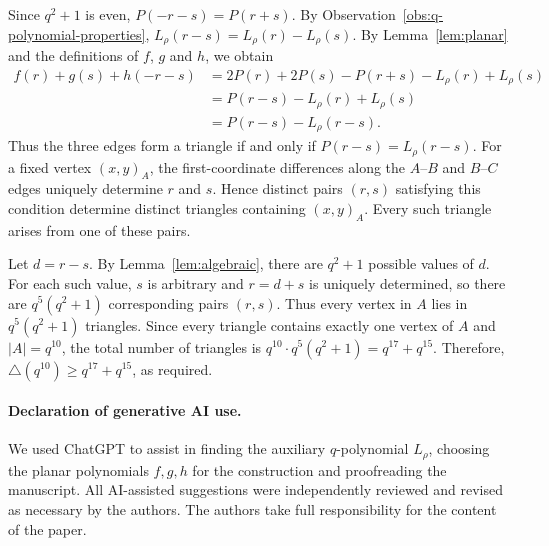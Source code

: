 \documentclass[12pt]{article}
\numberwithin{equation}{section}
\theoremstyle{definition}
\begin{document}
Since $q^2+1$ is even, $P(-r-s)=P(r+s)$. By Observation~\ref{obs:q-polynomial-properties}, $L_\rho(r-s)=L_\rho(r)-L_\rho(s)$. By Lemma~\ref{lem:planar} and the definitions of $f$, $g$ and $h$, we obtain
\[
\begin{aligned}
f(r)+g(s)+h(-r-s)
&=2P(r)+2P(s)-P(r+s)-L_\rho(r)+L_\rho(s)\\
&=P(r-s)-L_\rho(r)+L_\rho(s)\\
&=P(r-s)-L_\rho(r-s).
\end{aligned}
\]
Thus the three edges form a triangle if and only if $P(r-s)=L_\rho(r-s)$.
For a fixed vertex $(x,y)_A$, the first-coordinate differences along the $A$--$B$ and $B$--$C$ edges uniquely determine $r$ and $s$. Hence distinct pairs $(r,s)$ satisfying this condition determine distinct triangles containing $(x,y)_A$. Every such triangle arises from one of these pairs.

Let $d=r-s$. By Lemma~\ref{lem:algebraic}, there are $q^2+1$ possible values of $d$. For each such value, $s$ is arbitrary and $r=d+s$ is uniquely determined, so there are $q^5(q^2+1)$ corresponding pairs $(r,s)$. Thus every vertex in $A$ lies in $q^5(q^2+1)$ triangles. Since every triangle contains exactly one vertex of $A$ and $|A|=q^{10}$, the total number of triangles is $q^{10}\cdot q^5(q^2+1)=q^{17}+q^{15}$. Therefore, $\triangle(q^{10})\ge q^{17}+q^{15}$, as required.

\paragraph{Declaration of generative AI use.} We used ChatGPT to assist in finding the auxiliary $q$-polynomial $L_\rho$, choosing the planar polynomials $f,g,h$ for the construction and proofreading the manuscript. All AI-assisted suggestions were independently reviewed and revised as necessary by the authors. The authors take full responsibility for the content of the paper.
\end{document}
